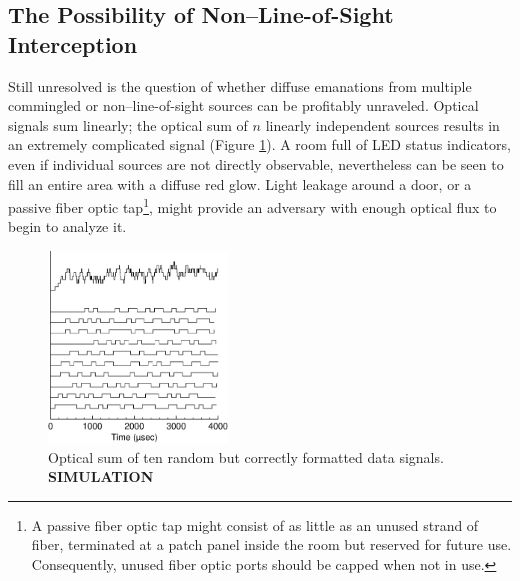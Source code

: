 \documentclass{acmtrans2e}
\begin{document}
\subsection{The Possibility of Non--Line-of-Sight Interception}

Still unresolved is the question of whether diffuse emanations from 
multiple commingled or non--line-of-sight sources can be profitably
unraveled.  Optical signals sum linearly; the optical sum of $n$ linearly
independent
sources results in an extremely complicated signal
(Figure \ref{diffuse_emanations_figure}).  A room full of
LED status indicators, even if individual sources
are not directly observable, nevertheless can be seen to fill an entire area with
a diffuse red glow.  Light leakage around a door, or a passive fiber optic 
tap\footnote{A passive fiber optic tap might consist of as little as an
unused strand of fiber, terminated at a patch panel inside the room but
reserved for future use.  Consequently, unused fiber optic ports should be
capped when not in use.}, might provide an adversary with enough optical
flux to begin to analyze it.

\begin{figure}
\centering
\includegraphics[height=2in]{Figure_8.5.eps}
\caption{Optical sum of ten random but correctly formatted data
signals.  {\bf SIMULATION}}
\label{diffuse_emanations_figure}
\end{figure}
\end{document}
